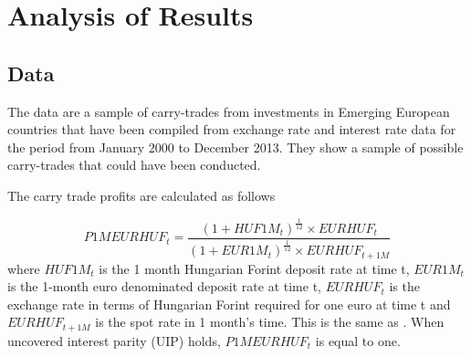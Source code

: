 \documentclass[12pt, a4paper, oneside]{article} %
\begin{document}






\section{Analysis of Results}
\subsection{Data}
The data are a sample of carry-trades from investments in Emerging European countries that have been compiled from exchange rate and interest rate data for the period from January 2000 to December 2013.  They show a sample of possible carry-trades that could have been conducted. 

The carry trade profits are calculated as follows

\begin{equation}\label{eqref:carryprofit}
P1MEURHUF_t = \frac{(1 + HUF1M_t)^{\frac{1}{12}} \times EURHUF_t }{(1 + EUR1M_t)^{\frac{1}{12}} \times EURHUF_{t+1M}}
\end{equation}
where $HUF1M_t$ is the 1 month Hungarian Forint deposit rate at time t, $EUR1M_t$ is the 1-month euro denominated deposit rate at time t, $EURHUF_t$ is the exchange rate in terms of  Hungarian Forint required for one euro at time t and  $EURHUF_{t+1M}$ is the spot rate in 1 month's time.  This is the same as \citep{BrunnermeierCarry}. When uncovered interest parity (UIP) holds, $P1MEURHUF_t$ is equal to one.  
\end{document}
